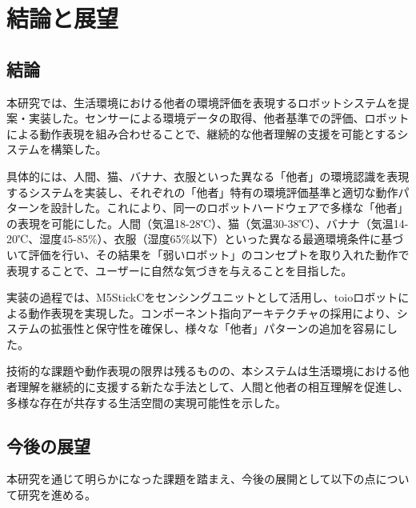 \documentclass{cuxarticle}
\begin{document}
\chapter{結論と展望}

\section{結論}
本研究では、生活環境における他者の環境評価を表現するロボットシステムを提案・実装した。センサーによる環境データの取得、他者基準での評価、ロボットによる動作表現を組み合わせることで、継続的な他者理解の支援を可能とするシステムを構築した。

具体的には、人間、猫、バナナ、衣服といった異なる「他者」の環境認識を表現するシステムを実装し、それぞれの「他者」特有の環境評価基準と適切な動作パターンを設計した。これにより、同一のロボットハードウェアで多様な「他者」の表現を可能にした。人間（気温18-28℃）、猫（気温30-38℃）、バナナ（気温14-20℃、湿度45-85\%）、衣服（湿度65\%以下）といった異なる最適環境条件に基づいて評価を行い、その結果を「弱いロボット」のコンセプトを取り入れた動作で表現することで、ユーザーに自然な気づきを与えることを目指した。

実装の過程では、M5StickCをセンシングユニットとして活用し、toioロボットによる動作表現を実現した。コンポーネント指向アーキテクチャの採用により、システムの拡張性と保守性を確保し、様々な「他者」パターンの追加を容易にした。

技術的な課題や動作表現の限界は残るものの、本システムは生活環境における他者理解を継続的に支援する新たな手法として、人間と他者の相互理解を促進し、多様な存在が共存する生活空間の実現可能性を示した。

\section{今後の展望}
本研究を通じて明らかになった課題を踏まえ、今後の展開として以下の点について研究を進める。
\end{document}

